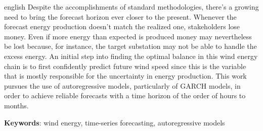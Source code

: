 \documentclass[
	12pt,				%
	openright,			%
	oneside,			%
	a4paper,			%
	english,			%
	french,				%
	spanish,			%
	brazil				%
	]{abntex2}
\begin{document}
\begin{resumo}[Abstract]
\begin{otherlanguage*}{english}
	Despite the accomplishments of standard methodologies, there's a growing need to bring the forecast horizon ever closer to the present. Whenever the forecast energy production doesn't match the realized one, stakeholders lose money. Even if more energy than expected is produced money may nevertheless be lost because, for instance, the target substation may not be able to handle the excess energy. 	
	An initial step into finding the optimal balance in this wind energy chain is to first confidently predict future wind speed since this is the variable that is mostly responsible for the uncertainty in energy production. This work pursues the use of autoregressive models, particularly of GARCH models, in order to achieve reliable forecasts with a time horizon of the order of hours to months.

 
   \textbf{Keywords}: wind energy, time-series forecasting, autoregressive models
 \end{otherlanguage*}
\end{resumo}

 

  

\listoffigures*

\end{document}
